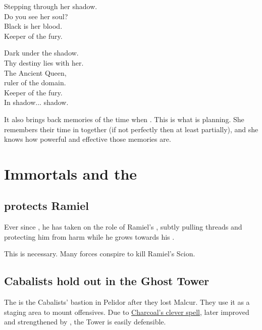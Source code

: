 \begin{garbage}
{  Stepping through her shadow. \\
  Do you see her soul?\\
  Black is her blood. \\
  Keeper of the fury. 
  
  Dark under the shadow. \\
  Thy destiny lies with her. \\
  The Ancient Queen, \\
  ruler of the domain. \\
  Keeper of the fury. \\
  In shadow... shadow.
}

It also brings back memories of the time when . 
This is what \Belzir{} is planning. 
She remembers their time in \Mystraacht{} together (if not perfectly then at least partially), and she knows how powerful and effective those memories are. 















\section{Immortals and the \Feud}









\subsection{\Azraid{} protects Ramiel}
Ever since , he has taken on the role of Ramiel's , subtly pulling threads and protecting him from harm while he grows towards his \apotheosis. 

This is necessary. 
Many forces conspire to kill Ramiel's Scion.







\subsection{Cabalists hold out in the Ghost Tower}
The  is the Cabalists' bastion in Pelidor after they lost Malcur. They use it as a staging area to mount offensives. Due to \hyperref[Charcoal at the Ghost Tower]{Charcoal's clever spell}, later improved and strengthened by \Achsah, the Tower is easily defensible. 


\end{garbage}
